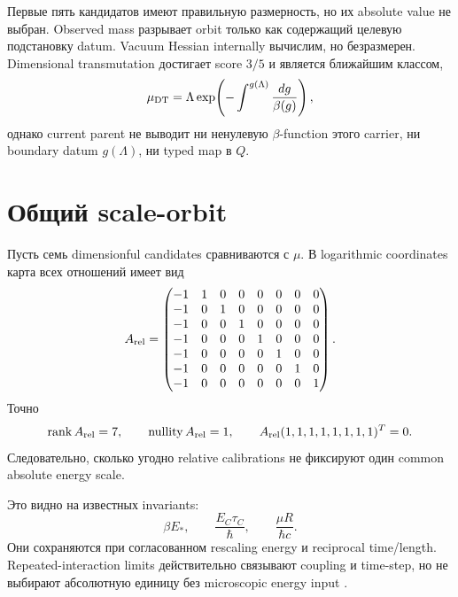Первые пять кандидатов имеют правильную размерность, но их absolute value
не выбран. Observed mass разрывает orbit только как содержащий целевую подстановку datum.
Vacuum Hessian internally вычислим, но безразмерен. Dimensional
transmutation достигает score $3/5$ и является ближайшим классом,
\begin{equation}
 \mu_{\rm DT}=\Lambda
 \exp\!\left(-\int^{g(\Lambda)}\frac{dg}{\beta(g)}\right),
 \label{eq:v9-mu-origin-dimensional-transmutation}
\end{equation}
однако current parent не выводит ни ненулевую $\beta$-function этого
carrier, ни boundary datum $g(\Lambda)$, ни typed map в $Q$.

\section{Общий scale-orbit}

Пусть семь dimensionful candidates сравниваются с $\mu$. В logarithmic
coordinates карта всех отношений имеет вид
\begin{equation}
 A_{\rm rel}=
 \begin{pmatrix}
 -1&1&0&0&0&0&0&0\\
 -1&0&1&0&0&0&0&0\\
 -1&0&0&1&0&0&0&0\\
 -1&0&0&0&1&0&0&0\\
 -1&0&0&0&0&1&0&0\\
 -1&0&0&0&0&0&1&0\\
 -1&0&0&0&0&0&0&1
 \end{pmatrix}.
 \label{eq:v9-mu-origin-relative-map}
\end{equation}
Точно
\begin{equation}
 \operatorname{rank} A_{\rm rel}=7,
 \qquad \operatorname{nullity}A_{\rm rel}=1,
 \qquad A_{\rm rel}(1,1,1,1,1,1,1,1)^T=0.
 \label{eq:v9-mu-origin-relative-rank}
\end{equation}
Следовательно, сколько угодно relative calibrations не фиксируют один
common absolute energy scale.

Это видно на известных invariants:
\begin{equation}
 \beta E_*,\qquad \frac{E_C\tau_C}{\hbar},\qquad
 \frac{\mu R}{\hbar c}.
 \label{eq:v9-mu-origin-known-invariants}
\end{equation}
Они сохраняются при согласованном rescaling energy и reciprocal time/length.
Repeated-interaction limits действительно связывают coupling и time-step,
но не выбирают абсолютную единицу без microscopic energy input
\cite{v9-mu-origin-attal2006}.

